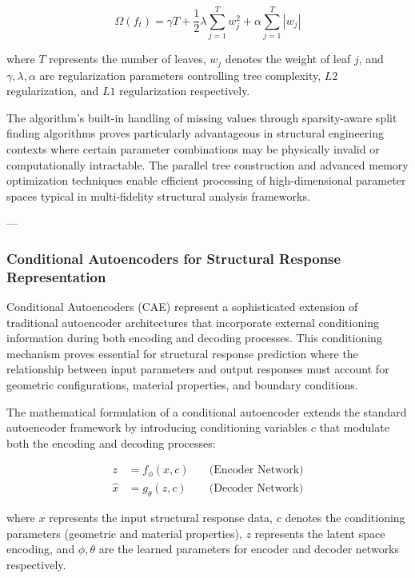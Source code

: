 \documentclass[12pt,a4paper]{report}
\begin{document}
\begin{equation}
\Omega(f_t) = \gamma T + \frac{1}{2} \lambda \sum_{j=1}^T w_j^2 + \alpha \sum_{j=1}^T |w_j|
\end{equation}

where $T$ represents the number of leaves, $w_j$ denotes the weight of leaf $j$, and $\gamma, \lambda, \alpha$ are regularization parameters controlling tree complexity, $L2$ regularization, and $L1$ regularization respectively.

The algorithm's built-in handling of missing values through sparsity-aware split finding algorithms proves particularly advantageous in structural engineering contexts where certain parameter combinations may be physically invalid or computationally intractable. The parallel tree construction and advanced memory optimization techniques enable efficient processing of high-dimensional parameter spaces typical in multi-fidelity structural analysis frameworks.

---

\subsubsection*{Conditional Autoencoders for Structural Response Representation}

Conditional Autoencoders (CAE) represent a sophisticated extension of traditional autoencoder architectures that incorporate external conditioning information during both encoding and decoding processes. This conditioning mechanism proves essential for structural response prediction where the relationship between input parameters and output responses must account for geometric configurations, material properties, and boundary conditions.

The mathematical formulation of a conditional autoencoder extends the standard autoencoder framework by introducing conditioning variables $c$ that modulate both the encoding and decoding processes:

\begin{align}
z &= f_{\phi}(x, c) \quad &\text{(Encoder Network)} \\
\hat{x} &= g_{\theta}(z, c) \quad &\text{(Decoder Network)}
\end{align}

where $x$ represents the input structural response data, $c$ denotes the conditioning parameters (geometric and material properties), $z$ represents the latent space encoding, and $\phi, \theta$ are the learned parameters for encoder and decoder networks respectively.
\end{document}
